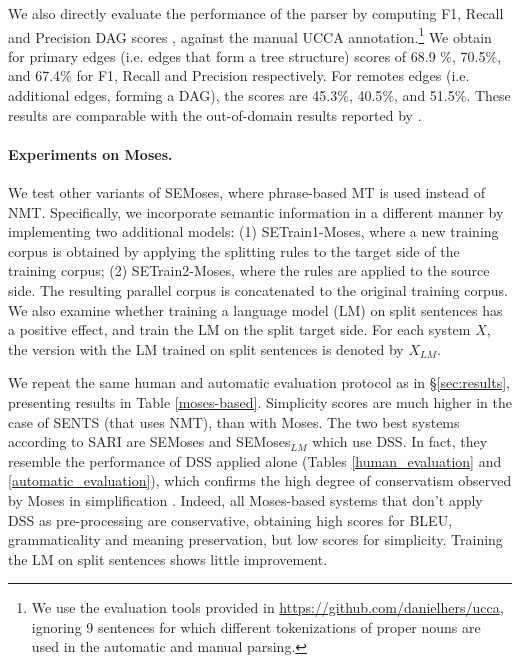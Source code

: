 \documentclass[11pt,a4paper]{article}
\begin{document}
We also directly evaluate the performance of the parser by computing F1, Recall and Precision DAG scores \citep{H17}, against the manual UCCA annotation.\footnote{We use the evaluation tools provided in \url{https://github.com/danielhers/ucca}, ignoring 9 sentences for which different tokenizations of proper nouns are used in the automatic and manual parsing.} We obtain for primary edges (i.e. edges that form a tree structure) scores of 68.9 $\%$, 70.5$\%$, and 67.4$\%$ for F1, Recall and Precision respectively. For remotes edges (i.e. additional edges, forming a DAG), the scores are 45.3$\%$, 40.5$\%$, and 51.5$\%$. These results are comparable with the  out-of-domain results reported by \citet{H17}.

\vspace{-0.2cm}
\paragraph{Experiments on Moses.}

We test other variants of SEMoses, where phrase-based MT is used instead of NMT.
Specifically, we incorporate semantic information in a different manner by implementing two additional models: 
(1) SETrain1-Moses, where a new training corpus is obtained by applying the splitting rules to the target 
side of the training corpus; (2) SETrain2-Moses, where the rules are applied to the source side. 
The resulting parallel corpus is concatenated to the original training corpus.
We also examine whether training a language model (LM) on split sentences has a positive effect,
and train the LM on the split target side.
For each system $X$, the version with the LM trained on split sentences is denoted by $X_{LM}$.

We repeat the same human and automatic evaluation protocol as in \S\ref{sec:results},
presenting results in Table \ref{moses-based}. 
Simplicity scores are much higher in the case of SENTS (that uses NMT), than with Moses.
The two best systems according to SARI are SEMoses and SEMoses$_{LM}$ which use DSS. 
In fact, they resemble the performance of DSS applied alone (Tables \ref{human_evaluation} and \ref{automatic_evaluation}),
which confirms the high degree of conservatism observed by Moses in simplification \citep{AM17}.
Indeed, all Moses-based systems that don't apply DSS as
pre-processing are conservative, obtaining high scores for BLEU, grammaticality and meaning preservation,
but low scores for simplicity.
Training the LM on split sentences shows little improvement. 
\end{document}

